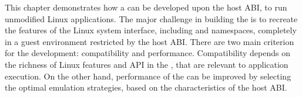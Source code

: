 This chapter
demonstrates how a \libos{} can be developed upon the host ABI,
to run unmodified Linux applications.
The major challenge in building the \libos{}
is to recreate the features of the Linux system interface, including
\linuxapis{} and namespaces, completely in a guest environment restricted by the host ABI.
There are two
main criterion for the \libos{} development:
compatibility and performance.
Compatibility depends on
the richness of Linux features and API
in the \libos{},
that are relevant to application execution.
On the other hand, performance of the \libos{} can be improved
by selecting the optimal emulation strategies,
based on the characteristics of the host ABI.





